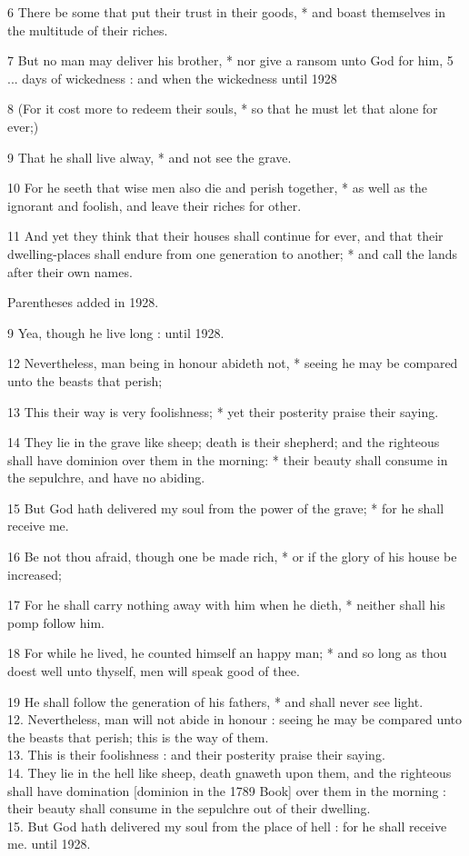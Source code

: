 6 There be some that put their trust in their goods,
* and boast themselves in the multitude of their riches.

7 But no man may deliver his brother, * nor give a ransom
unto God for him, 5 ... days of wickedness :
and when the wickedness
until 1928

8 (For it cost more to redeem their souls, * so that
he must let that alone for ever;)

9 That he shall live alway, * and not see the grave.

10 For he seeth that wise men also die and perish together,
* as well as the ignorant and foolish, and leave their riches for other.

11 And yet they think that their houses shall continue
for ever, and that their dwelling-places shall endure from one generation
to another; * and call the lands after their own names.

Parentheses
added in 1928.

9 Yea, though he live long :
until 1928.

12 Nevertheless, man being in honour abideth not, * seeing he may be compared
unto the beasts that perish;

13 This their way is very foolishness; * yet their posterity
praise their saying.

14 They lie in the grave like sheep; death is their shepherd;
and the righteous shall have dominion over them in the morning: * their
beauty shall consume in the sepulchre, and have no abiding.

15 But God hath delivered my soul from the power of the
grave; * for he shall receive me.

16 Be not thou afraid, though one be made rich, * or
if the glory of his house be increased;

17 For he shall carry nothing away with him when he dieth,
* neither shall his pomp follow him.

18 For while he lived, he counted himself an happy man;
* and so long as thou doest well unto thyself, men will speak good of thee.

19 He shall follow the generation of his fathers, * and
shall never see light.\\
12. Nevertheless, man will
not abide in honour : seeing he may be compared unto the beasts that perish;
this is the way of them.\\
13. This is their foolishness :
and their posterity praise their saying.\\
14. They
lie in the hell like sheep, death gnaweth upon them, and the righteous shall
have domination [dominion in
the 1789 Book] over them in the morning : their beauty shall consume
in the sepulchre out of their dwelling.\\
15. But God
hath delivered my soul from the place of hell : for he shall receive me.
until
1928.


